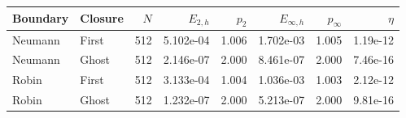 \begin{tabular}{llrrrrrr}
\hline
Boundary & Closure & $N$ & $E_{2,h}$ & $p_2$ & $E_{\infty,h}$ & $p_\infty$ & $\eta$ \\
\hline
Neumann & First & 512 & 5.102e-04 & 1.006 & 1.702e-03 & 1.005 & 1.19e-12 \\
Neumann & Ghost & 512 & 2.146e-07 & 2.000 & 8.461e-07 & 2.000 & 7.46e-16 \\
Robin & First & 512 & 3.133e-04 & 1.004 & 1.036e-03 & 1.003 & 2.12e-12 \\
Robin & Ghost & 512 & 1.232e-07 & 2.000 & 5.213e-07 & 2.000 & 9.81e-16 \\
\hline
\end{tabular}
